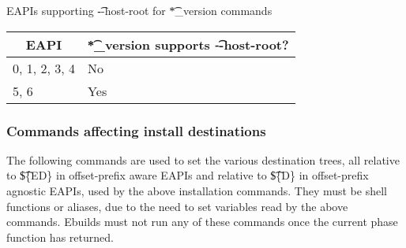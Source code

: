\begin{centertable}{EAPIs supporting \t{-{}-host-root} for \t{*\_version} commands}
    \label{tab:foo-version-host-root-table}
    \begin{tabular}{ll}
      \toprule
      \multicolumn{1}{c}{\textbf{EAPI}} &
      \multicolumn{1}{c}{\textbf{\t{*\_version} supports \t{-{}-host-root}?}} \\
      \midrule
      0, 1, 2, 3, 4     & No  \\
      5, 6              & Yes \\
      \bottomrule
    \end{tabular}
\end{centertable}

\subsubsection{Commands affecting install destinations}
The following commands are used to set the various destination trees, all relative to \t{\$\{ED\}} in
offset-prefix aware EAPIs and relative to \t{\$\{D\}} in offset-prefix agnostic EAPIs, used by the
above installation commands. They must be shell functions or aliases, due to the need to set variables
read by the above commands. Ebuilds must not run any of these commands once the current phase function
has returned.

